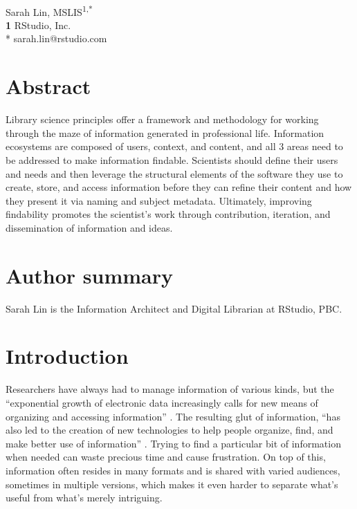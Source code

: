 \documentclass[10pt,letterpaper]{article}
\begin{document}
\vspace*{0.2in}

\begin{flushleft}
{\Large
\textbf{}
}
\newline
\\
{Sarah Lin, MSLIS}\textsuperscript{1,*}
\\
\textbf{1} RStudio, Inc.
\\
\bigskip
* sarah.lin@rstudio.com
\end{flushleft}

\section*{Abstract}

Library science principles offer a framework and methodology for working
through the maze of information generated in professional life.
Information ecosystems are composed of users, context, and content, and
all 3 areas need to be addressed to make information findable.
Scientists should define their users and needs and then leverage the
structural elements of the software they use to create, store, and
access information before they can refine their content and how they
present it via naming and subject metadata. Ultimately, improving
findability promotes the scientist's work through contribution,
iteration, and dissemination of information and ideas.

\section*{Author summary}

Sarah Lin is the Information Architect and Digital Librarian at RStudio,
PBC.

\section*{Introduction}

Researchers have always had to manage information of various kinds, but
the ``exponential growth of electronic data increasingly calls for new
means of organizing and accessing information'' \cite{Hedden2016}. The resulting
glut of information, ``has also led to the creation of new technologies
to help people organize, find, and make better use of information''
\cite{Rosenfeld2015}. Trying to find a particular bit of information when needed can
waste precious time and cause frustration. On top of this, information
often resides in many formats and is shared with varied audiences,
sometimes in multiple versions, which makes it even harder to separate
what's useful from what's merely intriguing.
\end{document}
